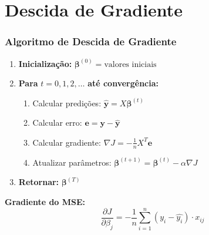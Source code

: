 \documentclass[xcolor=dvipsnames,t,aspectratio=169]{beamer} %
\begin{document}
\section{Descida de Gradiente}
\begin{frame}
    \frametitle{Algoritmo de Descida de Gradiente}
    \vspace{.25cm}
    \begin{display}
        \begin{enumerate}
            \item \textbf{Inicialização:} $\boldsymbol{\beta}^{(0)} = \text{valores iniciais}$
            \item \textbf{Para} $t = 0, 1, 2, \ldots$ \textbf{até convergência:}
            \begin{enumerate}
                \item Calcular predições: $\hat{\mathbf{y}} = X\boldsymbol{\beta}^{(t)}$
                \item Calcular erro: $\mathbf{e} = \mathbf{y} - \hat{\mathbf{y}}$
                \item Calcular gradiente: $\nabla J = -\frac{1}{n}X^T\mathbf{e}$
                \item Atualizar parâmetros: $\boldsymbol{\beta}^{(t+1)} = \boldsymbol{\beta}^{(t)} - \alpha \nabla J$
            \end{enumerate}
            \item \textbf{Retornar:} $\boldsymbol{\beta}^{(T)}$
        \end{enumerate}
    \end{display}
    
    \vspace{0.3cm}
    \textbf{Gradiente do MSE:}
    \begin{equation}
        \frac{\partial J}{\partial \beta_j} = -\frac{1}{n}\sum_{i=1}^{n}(y_i - \hat{y_i}) \cdot x_{ij}
    \end{equation}
\end{frame}

\end{document}
